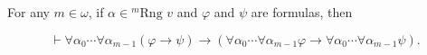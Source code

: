 For any $m \in \omega$, if $\alpha \in {}^{m}\text{Rng } v$ and $\varphi$ and $\psi$ are formulas, then

$$\vdash \forall \alpha_0 \cdots \forall \alpha_{m-1} (\varphi \rightarrow \psi) \rightarrow (\forall \alpha_0 \cdots \forall \alpha_{m-1} \varphi \rightarrow \forall \alpha_0 \cdots \forall \alpha_{m-1} \psi).$$
